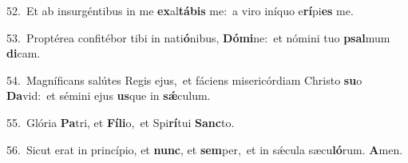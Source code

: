 {\numbfont\textcolor{\numbcolor}{52.}}~Et ab insurgéntibus in me \textbf{ex}\-al\-\textbf{tá}\-\textbf{bis} me:~\star a viro iníquo e\-\textbf{rí}\-pi\textbf{es} me.\par
{\numbfont\textcolor{\numbcolor}{53.}}~Proptérea confitébor tibi in nati\-\textbf{ó}\-nibus, \textbf{Dó}\-\textbf{mi}ne:~\star et nómini tuo \textbf{psal}\-mum \textbf{di}\-cam.\par
{\numbfont\textcolor{\numbcolor}{54.}}~Magníficans salútes Regis ejus,~\dagger et fáciens misericórdiam Christo \textbf{su}\-o \textbf{Da}\-vid:~\star et sémini ejus \textbf{us}\-que in \textbf{sǽ}\-culum.\par
{\numbfont\textcolor{\numbcolor}{55.}}~Glória \textbf{Pa}\-tri, et \textbf{Fí}\-\textbf{li}o,~\star et Spi\-\textbf{rí}\-tui \textbf{Sanc}\-to.\par
{\numbfont\textcolor{\numbcolor}{56.}}~Sicut erat in princípio, et \textbf{nunc}\-, et \textbf{sem}\-per,~\star et in sǽcula sæcu\-\textbf{ló}\-rum. \textbf{A}\-men.\par

